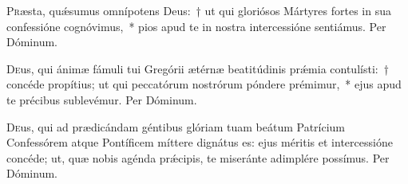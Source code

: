 \documentclass[vesperale_romanum.tex]{subfiles}
\begin{document}
\myrule


\semiduplex


\oratio

\lettrine{P}{r}æsta, quǽsumus omnípotens Deus:~† ut qui gloriósos Mártyres fortes in sua confessióne cognóvimus,~* pios apud te in nostra intercessióne sentiámus. Per Dóminum.

\commferiae

\myrule


\duplex


\oratio

\lettrine{D}{e}us, qui ánimæ fámuli tui Gregórii ætérnæ beatitúdinis prǽmia contulísti:~† concéde propítius; ut qui peccatórum nostrórum póndere prémimur,~* ejus apud te précibus sublevémur.
Per Dóminum.

\commferiae

\myrule

\newpage


\duplex

\oratio

\lettrine{D}{e}us, qui ad prædicándam géntibus glóriam tuam beátum Patrícium Confessórem atque Pontíficem míttere dignátus es: ejus méritis et intercessióne concéde; ut, quæ nobis agénda prǽcipis, te miseránte adimplére possímus. Per Dóminum.

\commferiae

\capitdeseqcommfer

\myrule


\duplex
\end{document}
